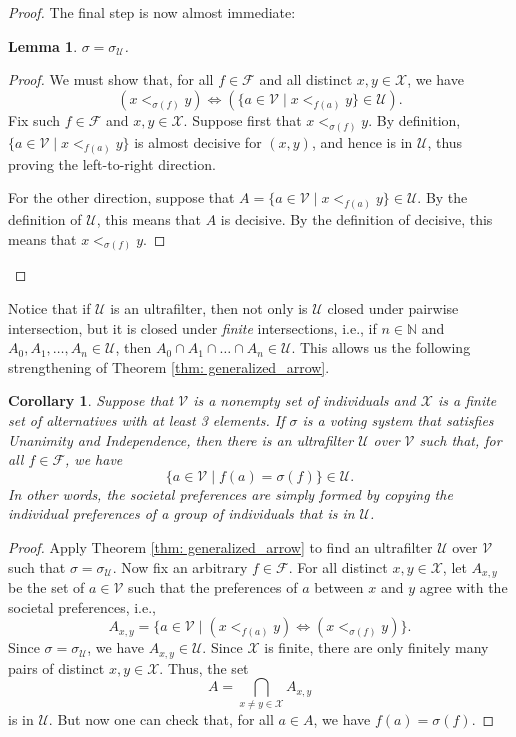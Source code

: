 \documentclass[a4paper]{memoir}
\newtheorem{lemma}[theorem]{Lemma}
\newtheorem{corollary}[theorem]{Corollary}
\theoremstyle{definition}
\newcommand{\bb}{\mathbb}
\newcommand{\mc}{\mathcal}
\begin{document}
\begin{proof}
  The final step is now almost immediate:
  \begin{lemma}
    $\sigma = \sigma_{\mc{U}}$.
  \end{lemma}
  
  \begin{proof}
    We must show that, for all $f \in \mc{F}$ and all distinct $x,y \in \mc{X}$, we have
    \[
      (x <_{\sigma(f)} y) \Longleftrightarrow (\{a \in \mc{V} \mid x <_{f(a)} y\} \in \mc{U}).
    \]
    Fix such $f \in \mc{F}$ and $x,y \in \mc{X}$. Suppose first that $x <_{\sigma(f)} y$. 
    By definition, $\{a \in \mc{V} \mid x <_{f(a)} y\}$ is almost decisive for $(x,y)$, and 
    hence is in $\mc{U}$, thus proving the left-to-right direction.
    
    For the other direction, suppose that $A = \{a \in \mc{V} \mid x <_{f(a)} y\} \in \mc{U}$. 
    By the definition of $\mc{U}$, this means that $A$ is decisive. By the definition of 
    decisive, this means that $x <_{\sigma(f)} y$.
  \end{proof}
\end{proof}

Notice that if $\mc{U}$ is an ultrafilter, then not only is $\mc{U}$ closed under pairwise 
intersection, but it is closed under \emph{finite} intersections, i.e., if 
$n \in \bb{N}$ and $A_0, A_1, \ldots, A_n \in \mc{U}$, then 
$A_0 \cap A_1 \cap \ldots \cap A_n \in \mc{U}$. This allows us the following strengthening of 
Theorem \ref{thm: generalized_arrow}.

\begin{corollary}
  Suppose that $\mc{V}$ is a nonempty set of individuals and $\mc{X}$ is a finite set of 
  alternatives with at least 3 elements. If $\sigma$ is a voting system that satisfies 
  Unanimity and Independence, then there is an ultrafilter $\mc{U}$ over $\mc{V}$ 
  such that, for all $f \in \mc{F}$, we have
  \[
    \{a \in \mc{V} \mid f(a) = \sigma(f)\} \in \mc{U}.
  \]
  In other words, the societal preferences are simply formed by copying the individual preferences 
  of a group of individuals that is in $\mc{U}$.
\end{corollary}

\begin{proof}
  Apply Theorem \ref{thm: generalized_arrow} to find an ultrafilter $\mc{U}$ over 
  $\mc{V}$ such that $\sigma = \sigma_{\mc{U}}$. Now fix an arbitrary $f \in \mc{F}$. 
  For all distinct $x,y \in \mc{X}$, let $A_{x,y}$ be the set of $a \in \mc{V}$ such 
  that the preferences of $a$ between $x$ and $y$ agree with the societal preferences, i.e., 
  \[
    A_{x,y} = \{a \in \mc{V} \mid (x <_{f(a)} y) \Leftrightarrow (x <_{\sigma(f)} y)\}.
  \]
  Since $\sigma = \sigma_{\mc{U}}$, we have $A_{x,y} \in \mc{U}$. Since $\mc{X}$ is finite, 
  there are only finitely many pairs of distinct $x,y \in \mc{X}$. Thus, the set
  \[
    A = \bigcap_{x \neq y \in \mc{X}} A_{x,y}
  \]
   is in $\mc{U}$. But now one can check that, for all $a \in A$, we have 
   $f(a) = \sigma(f)$.
\end{proof}
\end{document}
